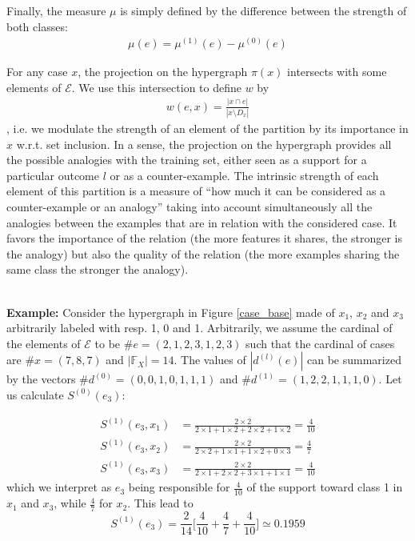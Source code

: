 \documentclass[sigconf,edbt]{acmart-edbt-workshops}
\begin{document}
Finally, the measure $\mu$ is simply defined by the difference between the strength of both classes:
\begin{align}
  \mu(e) = \mu^{(1)}(e) - \mu^{(0)}(e)
\end{align}


For any case $x$, the projection on the hypergraph $\pi(x)$ intersects with some elements of $\mathcal E$. We use this intersection to define $w$ by
\begin{align}
 w(e, x) = \frac{|x \cap e|}{|x \setminus D_x|}
 \end{align}, i.e. we modulate the strength of an element of the partition by its importance in $x$ w.r.t. set inclusion.
In a sense, the projection on the hypergraph provides all the possible analogies with the training set, either seen as a support for a particular outcome $l$ or as a counter-example. The intrinsic strength of each element of this partition is a measure of ``how much it can be considered as a counter-example or an analogy'' taking into account simultaneously all the analogies between the examples that are in relation with the considered case. It favors the importance of the relation (the more features it shares, the stronger is the analogy) but also the quality of the relation (the more examples sharing the same class the stronger the analogy). 


~\\\noindent
{\bf Example:} Consider the hypergraph in Figure \ref{case_base} made of $x_1$, $x_2$ and $x_3$ arbitrarily labeled with resp. 1, 0 and 1. Arbitrarily, we assume the cardinal of the elements of $\mathcal E$ to be $\#e = (2,1,2,3,1,2,3)$ such that the cardinal of cases are $\#x = (7, 8, 7)$ and $|\mathbb{F}_X| = 14$. The values of $|d^{(l)}(e)|$ can be summarized by the vectors $\#d^{(0)} = (0, 0, 1, 0, 1, 1, 1)$ and $\#d^{(1)} = (1 , 2, 2, 1, 1, 1, 0)$. Let us calculate $S^{(0)}(e_3)$:

\begin{align*}
S^{(1)}(e_3, x_1) & = \frac{2 \times 2}{2 \times 1 + 1 \times 2 + 2 \times 2 + 1 \times 2} = \frac 4 {10} \\
S^{(1)}(e_3, x_2) & = \frac{2 \times 2}{2 \times 2 + 1 \times 1 + 1 \times 2 + 0 \times 3} = \frac 4 {7} \\
S^{(1)}(e_3, x_3) & = \frac{2 \times 2}{2 \times 1 + 2 \times 2 + 3 \times 1 + 1 \times 1} = \frac 4 {10}
\end{align*}
 which we interpret as $e_3$ being responsible for $\frac{4}{10}$ of the support toward class 1 in $x_1$ and $x_3$, while $\frac{4}{7}$ for $x_2$.
This lead to
$$S^{(1)}(e_3) = \frac 2 {14} \big[ \frac 4 {10} + \frac 4 {7} + \frac 4 {10}\big] \simeq 0.1959$$
\end{document}
